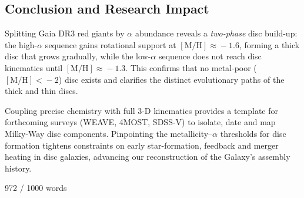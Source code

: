 \documentclass[a4paper,10pt]{article}
\begin{document}
\begin{multicols}{2}
\section*{Conclusion and Research Impact}

Splitting Gaia DR3 red giants by $\alpha$ abundance reveals a \emph{two-phase} disc build-up:  
the high-$\alpha$ sequence gains rotational support at $\mathrm{[M/H]}\!\approx\!-1.6$, forming 
a thick disc that grows gradually, while the low-$\alpha$ sequence does not reach disc 
kinematics until $\mathrm{[M/H]}\!\approx\!-1.3$. This confirms that no metal-poor 
($\mathrm{[M/H]}\!<\!-2$) disc exists and clarifies the distinct evolutionary paths of 
the thick and thin discs.  

Coupling precise chemistry with full 3-D kinematics provides a template for forthcoming surveys 
(WEAVE, 4MOST, SDSS-V) to isolate, date and map Milky-Way disc components. Pinpointing the 
metallicity–$\alpha$ thresholds for disc formation tightens constraints on early star-formation, 
feedback and merger heating in disc galaxies, advancing our reconstruction of the Galaxy’s 
assembly history.  


\newpage{}

972 / 1000 words








  


\end{multicols}
\end{document}
